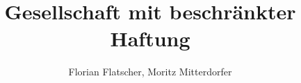 \author{Florian Flatscher, Moritz Mitterdorfer}
\title{Gesellschaft mit beschränkter Haftung}
\date{}
\maketitle
\newpage